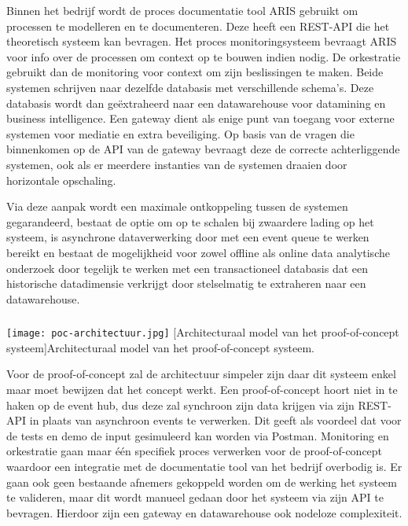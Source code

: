 Binnen het bedrijf wordt de proces documentatie tool ARIS gebruikt om processen te modelleren en te documenteren. Deze heeft een REST-API die het theoretisch systeem kan bevragen. Het proces monitoringsysteem bevraagt ARIS voor info over de processen om context op te bouwen indien nodig. De orkestratie gebruikt dan de monitoring voor context om zijn beslissingen te maken. Beide systemen schrijven naar dezelfde databasis met verschillende schema’s. Deze databasis wordt dan geëxtraheerd naar een datawarehouse voor datamining en business intelligence. Een gateway dient als enige punt van toegang voor externe systemen voor mediatie en extra beveiliging. Op basis van de vragen die binnenkomen op de API van de gateway bevraagt deze de correcte achterliggende systemen, ook als er meerdere instanties van de systemen draaien door horizontale opschaling. \newline

Via deze aanpak wordt een maximale ontkoppeling tussen de systemen gegarandeerd, bestaat de optie om op te schalen bij zwaardere lading op het systeem, is asynchrone dataverwerking door met een event queue te werken bereikt en bestaat de mogelijkheid voor zowel offline als online data analytische onderzoek door tegelijk te werken met een transactioneel databasis dat een historische datadimensie verkrijgt door stelselmatig te extraheren naar een datawarehouse. \newline

\subsubsection{}%
\label{subsubsec:architect Proof-of-concept}
\begin{center}
  \captionsetup{type=figure}
  \texttt{[image: poc-architectuur.jpg]}
  [Architecturaal model van het proof-of-concept systeem]{Architecturaal model van het proof-of-concept systeem.}
\end{center}
Voor de proof-of-concept zal de architectuur simpeler zijn daar dit systeem enkel maar moet bewijzen dat het concept werkt. Een proof-of-concept hoort niet in te haken op de event hub, dus deze zal synchroon zijn data krijgen via zijn REST-API in plaats van asynchroon events te verwerken. Dit geeft als voordeel dat voor de tests en demo de input gesimuleerd kan worden via Postman. Monitoring en orkestratie gaan maar één specifiek proces verwerken voor de proof-of-concept waardoor een integratie met de documentatie tool van het bedrijf overbodig is. Er gaan ook geen bestaande afnemers gekoppeld worden om de werking het systeem te valideren, maar dit wordt manueel gedaan door het systeem via zijn API te bevragen. Hierdoor zijn een gateway en datawarehouse ook nodeloze complexiteit.\newline

